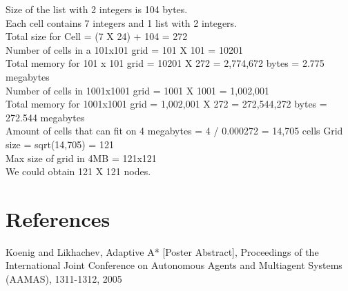 \documentclass[preprint,12pt,3p]{elsarticle}
\begin{document}
Size of the list with 2 integers is 104 bytes.\\

Each cell contains 7 integers and 1 list with 2 integers.\\

Total size for Cell = (7 X 24) + 104 = 272\\

Number of cells in a 101x101 grid = 101 X 101 = 10201\\

Total memory for 101 x 101 grid = 10201 X 272 = 2,774,672 bytes = 2.775 megabytes\\

Number of cells in 1001x1001 grid = 1001 X 1001 = 1,002,001\\

Total memory for 1001x1001 grid = 1,002,001 X 272 = 272,544,272 bytes =
272.544 megabytes\\

Amount of cells that can fit on 4 megabytes = 4 / 0.000272 = 14,705 cells Grid\\
size = sqrt(14,705) = 121\\

Max size of grid in 4MB = 121x121\\

We could obtain 121 X 121 nodes.\\


\section{References}
\label{sec7}
Koenig and Likhachev, Adaptive A* [Poster Abstract], Proceedings of the International Joint Conference on Autonomous Agents and Multiagent Systems (AAMAS), 1311-1312, 2005



%
% 
% 
% 
% 
% 
% 
% 
% 
% 
% 
% 
% 

%
\end{document}
